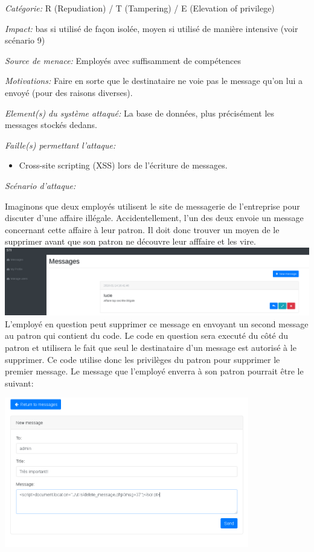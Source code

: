 \documentclass{article}
\begin{document}
\textit{Catégorie:} R (Repudiation) / T (Tampering) / E (Elevation of
privilege)

\textit{Impact:} bas si utilisé de façon isolée, moyen si utilisé de
manière intensive (voir scénario 9)

\textit{Source de menace:} Employés avec suffisamment de compétences

\textit{Motivations:} Faire en sorte que le destinataire ne voie pas le message qu'on lui a
  envoyé (pour des raisons diverses).

\textit{Element(s) du système attaqué:} La base de données, plus
précisément les messages stockés dedans.

\textit{Faille(s) permettant l'attaque:}

\begin{itemize}

\item
  Cross-site scripting (XSS) lors de l'écriture de messages.
\end{itemize}

\textit{Scénario d'attaque:}

Imaginons que deux employés utilisent le site de messagerie de
l'entreprise pour discuter d'une affaire illégale. Accidentellement,
l'un des deux envoie un message concernant cette affaire à leur patron.
Il doit donc trouver un moyen de le supprimer avant que son patron ne
découvre leur afffaire et les vire.\\

\includegraphics[width=\textwidth]{images/delete1.PNG}\\

L'employé en question peut supprimer ce message en envoyant un second
message au patron qui contient du code. Le code en question sera executé
du côté du patron et utilisera le fait que seul le destinataire d'un
message est autorisé à le supprimer. Ce code utilise donc les privilèges
du patron pour supprimer le premier message. Le message que l'employé
enverra à son patron pourrait être le suivant:\\

\begin{center}\includegraphics[width=0.8\textwidth]{images/delete2.PNG}\end{center}
\end{document}
